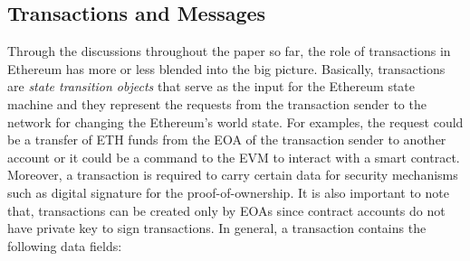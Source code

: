 \subsection{Transactions and Messages}


Through the discussions throughout the paper so far, the role of transactions in Ethereum has more or less blended into the big picture. Basically, transactions are \textit{state transition objects} that serve as the input for the Ethereum state machine and they represent the requests from the transaction sender to the network for changing the Ethereum's world state. For examples, the request could be a transfer of ETH funds from the EOA of the transaction sender to another account or it could be a command to the EVM to interact with a smart contract. Moreover, a transaction is required to carry certain data for security mechanisms such as digital signature for the proof-of-ownership. It is also important to note that, transactions can be created only by EOAs since contract accounts do not have private key to sign transactions. In general, a transaction contains the following data fields:

